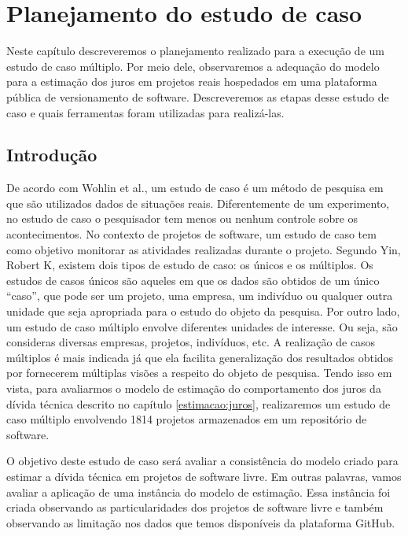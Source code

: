 \chapter{Planejamento do estudo de caso}
\label{cap_estudo_caso}

Neste capítulo descreveremos o planejamento realizado para a execução de um estudo de caso múltiplo.  Por meio dele, observaremos a adequação do modelo para a estimação dos juros em projetos reais hospedados em uma plataforma pública de versionamento de software. Descreveremos as etapas desse estudo de caso e quais ferramentas foram utilizadas para realizá-las.


\section{Introdução}

De acordo com Wohlin et al.\cite{wohlin2003empirical}, um estudo de caso é um método de pesquisa em que são utilizados dados de situações reais. Diferentemente de um experimento, no estudo de caso o pesquisador tem menos ou nenhum controle sobre os acontecimentos.  No contexto de projetos de software, um estudo de caso tem como objetivo monitorar as atividades realizadas durante o projeto. Segundo Yin, Robert K\cite{yin2011applications}, existem dois tipos de estudo de caso: os únicos e os múltiplos. Os estudos de casos únicos são aqueles em que os dados são obtidos de um único ``caso'',  que pode ser um projeto, uma empresa, um indivíduo ou qualquer outra unidade que seja apropriada para o estudo do objeto da pesquisa. Por outro lado, um estudo de caso múltiplo envolve diferentes unidades de interesse. Ou seja, são consideras diversas empresas, projetos, indivíduos, etc. A realização de casos múltiplos é mais indicada já que ela facilita generalização dos resultados obtidos por fornecerem múltiplas visões a respeito do objeto de pesquisa. Tendo isso em vista,  para avaliarmos o modelo de estimação do comportamento dos juros da dívida técnica descrito no capítulo \ref{estimacao:juros}, realizaremos um estudo de caso múltiplo envolvendo 1814 projetos armazenados em um repositório de software.

O objetivo deste estudo de caso será avaliar a consistência do modelo criado para estimar a dívida técnica em  projetos de software livre. Em outras palavras, vamos avaliar a aplicação de uma instância do modelo de estimação. Essa instância foi criada observando as particularidades dos projetos de software livre e também observando as limitação nos dados que temos disponíveis da plataforma GitHub.

